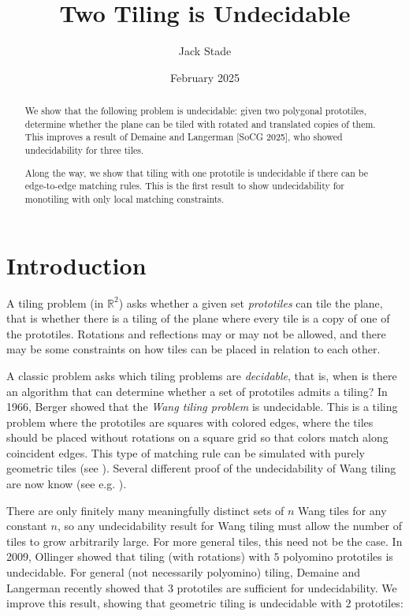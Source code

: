 \documentclass[11pt]{article}
\title{Two Tiling is Undecidable}
\author{Jack Stade}
\date{February 2025}
\theoremstyle{plain}
\theoremstyle{definition}
\begin{document}
\maketitle

\begin{abstract}
We show that the following problem is undecidable: given two polygonal prototiles, determine whether the plane can be tiled with rotated and translated copies of them. This improves a result of Demaine and Langerman [SoCG 2025], who showed undecidability for three tiles.

Along the way, we show that tiling with one prototile is undecidable if there can be edge-to-edge matching rules. This is the first result to show undecidability for monotiling with only local matching constraints.
\end{abstract}

\tableofcontents

\section{Introduction}

A tiling problem (in $\mathbb{R}^2$) asks whether a given set \emph{prototiles} can tile the plane, that is whether there is a tiling of the plane where every tile is a copy of one of the prototiles. Rotations and reflections may or may not be allowed, and there may be some constraints on how tiles can be placed in relation to each other.

A classic problem asks which tiling problems are \emph{decidable}, that is, when is there an algorithm that can determine whether a set of prototiles admits a tiling? In 1966, Berger \cite{BergerWangTiling} showed that the \emph{Wang tiling problem} is undecidable. This is a tiling problem where the prototiles are squares with colored edges, where the tiles should be placed without rotations on a square grid so that colors match along coincident edges. This type of matching rule can be simulated with purely geometric tiles (see \cite{GolombSimulatingWangTiles}). Several different proof of the undecidability of Wang tiling are now know (see e.g. \cite{KariWangTiling,OllingerWangTiling,RobinsonWangTiling}).

There are only finitely many meaningfully distinct sets of $n$ Wang tiles for any constant $n$, so any undecidability result for Wang tiling must allow the number of tiles to grow arbitrarily large. For more general tiles, this need not be the case. In 2009, Ollinger \cite{Ollinger5Tiling} showed that tiling (with rotations) with $5$ polyomino prototiles is undecidable. For general (not necessarily polyomino) tiling, Demaine and Langerman \cite{DemaineLangerman3Tiling} recently showed that $3$ prototiles are sufficient for undecidability. We improve this result, showing that geometric tiling is undecidable with $2$ prototiles:
\end{document}
